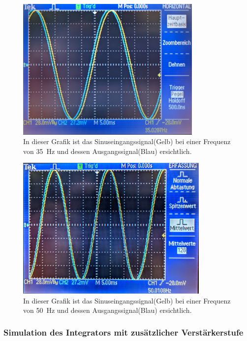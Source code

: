\documentclass[12pt,english,ngerman]{scrartcl}
\begin{document}
\begin{figure}[H]
  \centering
    \includegraphics[width=\linewidth, height=7cm]{./figures/integrator/35hz.jpg}
    \caption{In dieser Grafik ist das Sinuseingangssignal(Gelb) bei einer Frequenz von
    \SI{35}{\Hz} und dessen Ausgangssignal(Blau) ersichtlich.}
  \label{fig:mess_integrator_35hz}
\end{figure}

\begin{figure}[H]
  \centering
   \includegraphics[width=\linewidth, height=7cm]{./figures/integrator/50hz.jpg}
    \caption{In dieser Grafik ist das Sinuseingangssignal(Gelb) bei einer Frequenz von
    \SI{50}{\Hz} und dessen Ausgangssignal(Blau) ersichtlich.}
  \label{fig:mess_integrator_50hz}
\end{figure}


\subsubsection{Simulation des Integrators mit zusätzlicher Verstärkerstufe}
\end{document}
